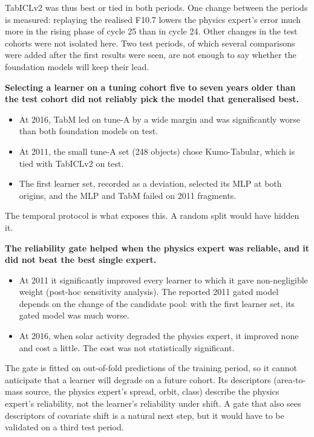 \documentclass[
]{article}
\newcounter{none} %
\providecommand{\tightlist}{%
  \setlength{\itemsep}{0pt}\setlength{\parskip}{0pt}}
\begin{document}
TabICLv2 was thus best or tied in both periods. One change between the
periods is measured: replaying the realised F10.7 lowers the physics
expert's error much more in the rising phase of cycle 25 than in cycle
24. Other changes in the test cohorts were not isolated here. Two test
periods, of which several comparisons were added after the first results
were seen, are not enough to say whether the foundation models will keep
their lead.

\textbf{Selecting a learner on a tuning cohort five to seven years older
than the test cohort did not reliably pick the model that generalised
best.}

\begin{itemize}
\tightlist
\item
  At 2016, TabM led on tune-A by a wide margin and was significantly
  worse than both foundation models on test.
\item
  At 2011, the small tune-A set (248 objects) chose Kumo-Tabular, which
  is tied with TabICLv2 on test.
\item
  The first learner set, recorded as a deviation, selected its MLP at
  both origins, and the MLP and TabM failed on 2011 fragments.
\end{itemize}

The temporal protocol is what exposes this. A random split would have
hidden it.

\textbf{The reliability gate helped when the physics expert was
reliable, and it did not beat the best single expert.}

\begin{itemize}
\tightlist
\item
  At 2011 it significantly improved every learner to which it gave
  non-negligible weight (post-hoc sensitivity analysis). The reported
  2011 gated model depends on the change of the candidate pool: with the
  first learner set, its gated model was much worse.
\item
  At 2016, when solar activity degraded the physics expert, it improved
  none and cost a little. The cost was not statistically significant.
\end{itemize}

The gate is fitted on out-of-fold predictions of the training period, so
it cannot anticipate that a learner will degrade on a future cohort. Its
descriptors (area-to-mass source, the physics expert's spread, orbit,
class) describe the physics expert's reliability, not the learner's
reliability under shift. A gate that also sees descriptors of covariate
shift is a natural next step, but it would have to be validated on a
third test period.
\end{document}

